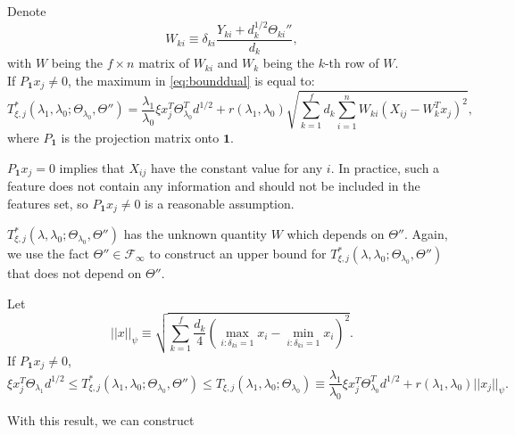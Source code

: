 \begin{lemma}
    \label{lem:3}
    Denote
    \begin{equation}
        \label{eq:w}
        W_{ki}\equiv\delta_{ki}\frac{Y_{ki}+d_k^{1/2}\Theta_{ki}''}{d_k},
    \end{equation}
    with $W$ being the $f\times n$ matrix of $W_{ki}$ and $W_k$ being the $k$-th row of $W$.\\
    If $P_{\mathbf{1}}x_j\neq 0$, the maximum in \eqref{eq:bounddual} is equal to:
    \begin{equation}
        \label{eq:tstar}
        T^*_{\xi,j}(\lambda_1,\lambda_0;\Theta_{\lambda_0},\Theta'')=\frac{\lambda_1}{\lambda_0}\xi x_j^T\Theta_{\lambda_0}^Td^{1/2}+r(\lambda_1,\lambda_0)\sqrt{\sum_{k=1}^fd_k\sum_{i=1}^nW_{ki}\left(X_{ij}-W_k^Tx_j\right)^2},
    \end{equation}
    where $P_{\mathbf{1}}$ is the projection matrix onto $\mathbf{1}$.
\end{lemma}

$P_{\mathbf{1}}x_j=0$ implies that $X_{ij}$ have the constant value for any $i$. In practice, such a feature does not contain any information and should not be included in the features set, so $P_{\mathbf{1}}x_j\neq 0$ is a reasonable assumption.

$T^*_{\xi,j}(\lambda,\lambda_0;\Theta_{\lambda_0},\Theta'')$ has the unknown quantity $W$ which depends on $\Theta''$. Again, we use the fact $\Theta''\in\mathcal{F}_\infty$ to construct an upper bound for $T^*_{\xi,j}(\lambda,\lambda_0;\Theta_{\lambda_0},\Theta'')$ that does not depend on $\Theta''$.

\begin{theorem}
    \label{thm:2}
    Let
    \begin{equation}
        \label{eq:prod}
        ||x||_\psi\equiv\sqrt{\sum_{k=1}^f\frac{d_k}{4}\left(\max_{i:\delta_{ki}=1}x_i-\min_{i:\delta_{ki}=1}x_i\right)^2}.
    \end{equation}
    If $P_{\mathbf{1}}x_j\neq 0$,
    \begin{equation}
        \label{eq:gbbar}
        \xi x_j^T\Theta_{\lambda_1}d^{1/2}\leq T^*_{\xi,j}(\lambda_1,\lambda_0;\Theta_{\lambda_0},\Theta'')\leq T_{\xi,j}(\lambda_1,\lambda_0;\Theta_{\lambda_0})\equiv\frac{\lambda_1}{\lambda_0}\xi x_j^T\Theta_{\lambda_0}^Td^{1/2}+r(\lambda_1,\lambda_0)||x_j||_\psi.
    \end{equation}
\end{theorem}

With this result, we can construct


